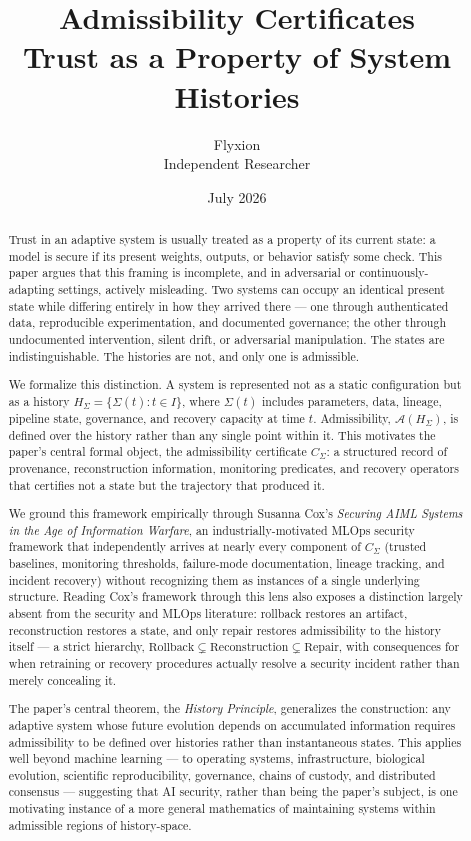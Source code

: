 \documentclass[11pt]{article}
\title{\textbf{Admissibility Certificates} \\[0.3em]
       \large Trust as a Property of System Histories}
\author{Flyxion \\ \small Independent Researcher}
\date{July 2026}
\begin{document}
\maketitle

\begin{abstract}
Trust in an adaptive system is usually treated as a property of its current state: a model is secure if its present weights, outputs, or behavior satisfy some check. This paper argues that this framing is incomplete, and in adversarial or continuously-adapting settings, actively misleading. Two systems can occupy an identical present state while differing entirely in how they arrived there --- one through authenticated data, reproducible experimentation, and documented governance; the other through undocumented intervention, silent drift, or adversarial manipulation. The states are indistinguishable. The histories are not, and only one is admissible.

We formalize this distinction. A system is represented not as a static configuration but as a history $H_\Sigma = \{\Sigma(t) : t \in I\}$, where $\Sigma(t)$ includes parameters, data, lineage, pipeline state, governance, and recovery capacity at time $t$. Admissibility, $\mathcal{A}(H_\Sigma)$, is defined over the history rather than any single point within it. This motivates the paper's central formal object, the admissibility certificate $C_\Sigma$: a structured record of provenance, reconstruction information, monitoring predicates, and recovery operators that certifies not a state but the trajectory that produced it.

We ground this framework empirically through Susanna Cox's \emph{Securing AIML Systems in the Age of Information Warfare}, an industrially-motivated MLOps security framework that independently arrives at nearly every component of $C_\Sigma$ (trusted baselines, monitoring thresholds, failure-mode documentation, lineage tracking, and incident recovery) without recognizing them as instances of a single underlying structure. Reading Cox's framework through this lens also exposes a distinction largely absent from the security and MLOps literature: rollback restores an artifact, reconstruction restores a state, and only repair restores admissibility to the history itself --- a strict hierarchy, $\text{Rollback} \subsetneq \text{Reconstruction} \subsetneq \text{Repair}$, with consequences for when retraining or recovery procedures actually resolve a security incident rather than merely concealing it.

The paper's central theorem, the \emph{History Principle}, generalizes the construction: any adaptive system whose future evolution depends on accumulated information requires admissibility to be defined over histories rather than instantaneous states. This applies well beyond machine learning --- to operating systems, infrastructure, biological evolution, scientific reproducibility, governance, chains of custody, and distributed consensus --- suggesting that AI security, rather than being the paper's subject, is one motivating instance of a more general mathematics of maintaining systems within admissible regions of history-space.
\end{abstract}
\end{document}
